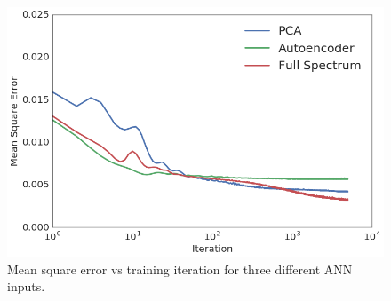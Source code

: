 \documentclass[thesis,tocnosub,noragright,centerchapter,12pt,fullpage]{uiucecethesis09}
\begin{document}


\begin{figure}[H]
    \centering
    \includegraphics[width=0.5\linewidth]{images/MSE_vs_iteration}
    \caption{Mean square error vs training iteration for three different ANN inputs.}
    \label{fig:enrichment_error}
\end{figure}

\end{document}
